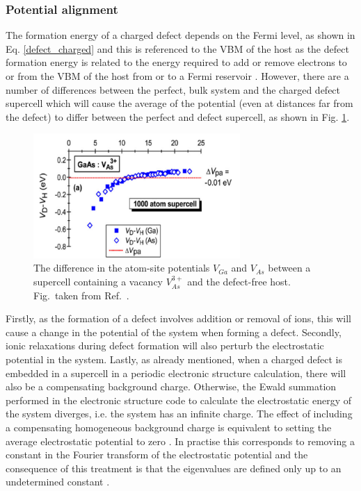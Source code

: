 \documentclass[11pt, twoside]{report}
\begin{document}
\subsubsection{Potential alignment}
The formation energy of a charged defect depends on the Fermi level, as shown in Eq. \ref{defect_charged} and this is referenced to the VBM of the host as the defect formation energy is related to the energy required to add or remove electrons to or from the VBM of the host from or to a Fermi reservoir \cite{Alex_defects}.
However, there are a number of differences between the perfect, bulk system and the charged defect supercell which will cause the average of the potential (even at distances far from the defect) to differ between the perfect and defect supercell, as shown in Fig. \ref{pa}.
\begin{figure}[h!]
  \centering
    \includegraphics[width=0.7\textwidth]{figures/pa.png}
    \caption[The difference in the atom-site potentials $V_{Ga}$ and $V_{As}$ between a supercell containing a vacancy $V_{As}^{3+}$ and the defect-free host.]{The difference in the atom-site potentials $V_{Ga}$ and $V_{As}$ between a supercell containing a vacancy $V_{As}^{3+}$ and the defect-free host. Fig.~taken from Ref.~.}
  \label{pa}
\end{figure}

Firstly, as the formation of a defect involves addition or removal of ions, this will cause a change in the potential of the system when forming a defect. Secondly, ionic relaxations during defect formation will also perturb the electrostatic potential in the system. Lastly, as already mentioned, when a charged defect is embedded in a supercell in a periodic electronic structure calculation, there will also be a compensating background charge. Otherwise, the Ewald summation performed in the electronic structure code to calculate the electrostatic energy of the system diverges, i.e. the system has an infinite charge. The effect of including a compensating homogeneous background charge is equivalent to setting the average electrostatic potential to zero \cite{freysoldt_rev}. 
In practise this corresponds to removing a constant in the Fourier transform of the electrostatic potential and the consequence of this treatment is that the eigenvalues are defined only up to an undetermined constant \cite{kumagai_oba, kumagai_oba_9}.
\end{document}
